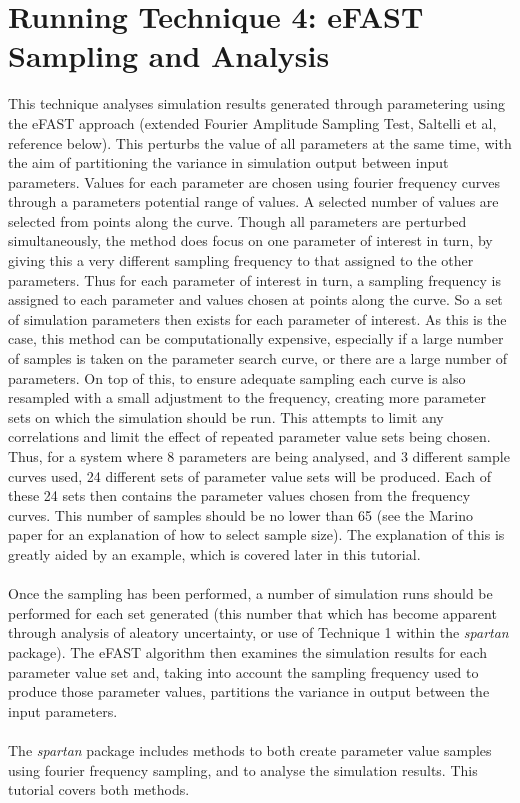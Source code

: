 \documentclass[a4paper,11pt]{article}
\begin{document}
\section{Running Technique 4: eFAST Sampling and Analysis}

\noindent This technique analyses simulation results generated through parametering using the eFAST approach (extended Fourier Amplitude Sampling Test, Saltelli et al, reference below). This perturbs the value of all parameters at the same time, with the aim of partitioning the variance in simulation output between input parameters. Values for each parameter are chosen using fourier frequency curves through a parameters potential range of values. A selected number of values are selected from points along the curve. Though all parameters are perturbed simultaneously, the method does focus on one parameter of interest in turn, by giving this a very different sampling frequency to that assigned to the other parameters. Thus for each parameter of interest in turn, a sampling frequency is assigned to each parameter and values chosen at points along the curve. So a set of simulation parameters then exists for each parameter of interest.  As this is the case, this method can be computationally expensive, especially if a large number of samples is taken on the parameter search curve, or there are a large number of parameters. On top of this, to ensure adequate sampling each curve is also resampled with a small adjustment to the frequency, creating more parameter sets on which the simulation should be run. This attempts to limit any correlations and limit the effect of repeated parameter value sets being chosen. Thus, for a system where 8 parameters are being analysed, and 3 different sample curves used, 24 different sets of parameter value sets will be produced. Each of these 24 sets then contains the parameter values chosen from the frequency curves. This number of samples should be no lower than 65 (see the Marino paper for an explanation of how to select sample size). The explanation of this is greatly aided by an example, which is covered later in this tutorial.\\
\\
Once the sampling has been performed, a number of simulation runs should be performed for each set generated (this number that which has become apparent through analysis of aleatory uncertainty, or use of Technique 1 within the \textit{spartan} package). The eFAST algorithm then examines the simulation results for each parameter value set and, taking into account the sampling frequency used to produce those parameter values, partitions the variance in output between the input parameters.\\
\\
The \textit{spartan} package includes methods to both create parameter value samples using fourier frequency sampling, and to analyse the simulation results. This tutorial covers both methods.\\
\end{document}
